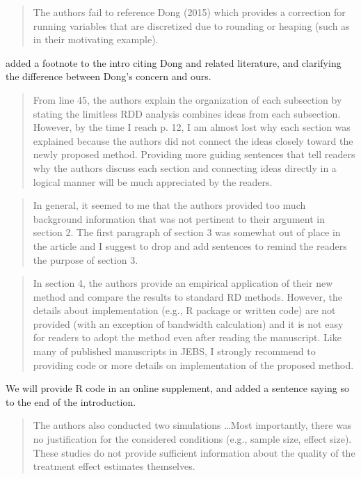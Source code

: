 \documentclass[12pt]{article}
\begin{document}
\begin{quote}
The authors fail to reference Dong (2015) which provides a correction
for running variables that are discretized due to rounding or heaping
(such as in their motivating example).
\end{quote}
added a footnote to the intro citing Dong and related literature, and
clarifying the difference between Dong's concern and ours.

\begin{quote}
From line 45, the authors explain the organization of each subsection
by stating the limitless RDD analysis combines ideas from each
subsection. However, by the time I reach p. 12, I am almost lost why
each section was explained because the authors did not connect the
ideas closely toward the newly proposed method. Providing more guiding
sentences that tell readers why the authors discuss each section and
connecting ideas directly in a logical manner will be much appreciated
by the readers.
\end{quote}

\begin{quote}
In general, it seemed to me that the authors provided too much
background information that was not pertinent to their argument in
section 2. The first paragraph of section 3 was somewhat out of place
in the article and I suggest to drop and add sentences to remind the
readers the purpose of section 3.
\end{quote}

\begin{quote}
In section 4, the authors provide an empirical application of their
new method and compare the results to standard RD methods. However,
the details about implementation (e.g., R package or written code) are
not provided (with an exception of bandwidth calculation) and it is
not easy for readers to adopt the method even after reading the
manuscript. Like many of published manuscripts in JEBS, I strongly
recommend to providing code or more details on implementation of the
proposed method.
\end{quote}
We will provide R code in an online supplement, and added a sentence
saying so to the end of the introduction.


\begin{quote}
The authors also conducted two simulations \dots Most importantly, there was no justification for the considered
conditions (e.g., sample size, effect size). These studies do not
provide sufficient information about the quality of the treatment
effect estimates themselves.
\end{quote}
\end{document}
